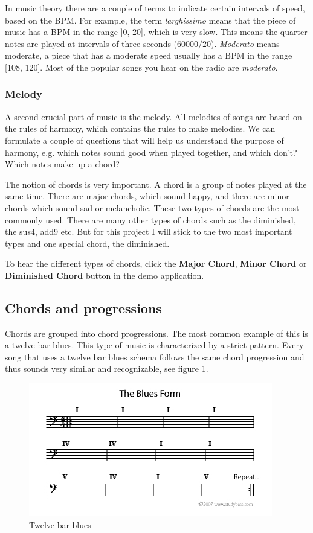 \documentclass[12pt]{article}
\begin{document}
In music theory there are a couple of terms to indicate certain intervals of speed, based on the BPM. For example, the term \textit{larghissimo} means that the piece of music has a BPM in the range ]0, 20], which is very slow. This means the quarter notes are played at intervals of three seconds ($60000 / 20$). \textit{Moderato} means moderate, a piece that has a moderate speed usually has a BPM in the range [108, 120]. Most of the popular songs you hear on the radio are \textit{moderato}.

\subsubsection{Melody}

A second crucial part of music is the melody. All melodies of songs are based on the rules of harmony, which contains the rules to make melodies. We can formulate a couple of questions that will help us understand the purpose of harmony, e.g. which notes sound good when played together, and which don't? Which notes make up a chord?
\newline

The notion of chords is very important. A chord is a group of notes played at the same time.
There are major chords, which sound happy, and there are minor chords which sound sad or melancholic. These two types of chords are the most commonly used. There are many other types of chords such as the diminished, the sus4, add9 etc. But for this project I will stick to the two most important types and one special chord, the diminished.
\newline

To hear the different types of chords, click the \textbf{Major Chord}, \textbf{Minor Chord} or \textbf{Diminished Chord} button in the demo application. 

\subsection{Chords and progressions}

Chords are grouped into chord progressions. The most common example of this is a twelve bar blues. This type of music is characterized by a strict pattern. Every song that uses a twelve bar blues schema follows the same chord progression and thus sounds very similar and recognizable, see figure 1.
\newline

\begin{figure}[h]
\centering
\includegraphics[scale=0.8]{img/the-blues-form}
\caption{Twelve bar blues}
\end{figure}
\end{document}
